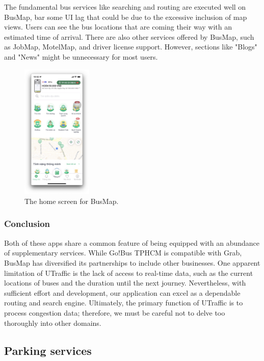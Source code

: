 The fundamental bus services like searching and routing are executed well on BusMap, bar some UI lag that could be due to the excessive inclusion of map views. Users can see the bus locations that are coming their way with an estimated time of arrival. There are also other services offered by BusMap, such as JobMap, MotelMap, and driver license support. However, sections like "Blogs" and "News" might be unnecessary for most users.

\begin{figure}[H]
    \centering
    \includegraphics[width=0.3\textwidth]{assets/images/Research/Bus/busmap_home.png}
    \caption{The home screen for BusMap.}
    \label{fig:busmap_homescreen}
\end{figure}

\subsubsection{Conclusion}

Both of these apps share a common feature of being equipped with an abundance of supplementary services. While Go!Bus TPHCM is compatible with Grab, BusMap has diversified its partnerships to include other businesses. One apparent limitation of UTraffic is the lack of access to real-time data, such as the current locations of buses and the duration until the next journey. Nevertheless, with sufficient effort and development, our application can excel as a dependable routing and search engine. Ultimately, the primary function of UTraffic is to process congestion data; therefore, we must be careful not to delve too thoroughly into other domains.


\subsection{Parking services}

